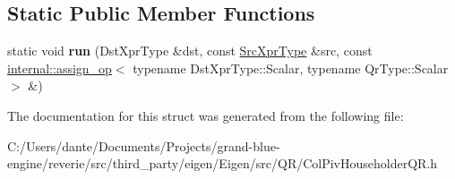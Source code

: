 \subsection*{Static Public Member Functions}
\begin{DoxyCompactItemize}
\item 
\mbox{\label{struct_eigen_1_1internal_1_1_assignment_3_01_dst_xpr_type_00_01_inverse_3_01_col_piv_householdera738c212c6cb5ba27ad8c50c6864d6b5_abd58dc876e3e7da378577a72fb5ffa06}} 
static void {\bfseries run} (Dst\+Xpr\+Type \&dst, const \mbox{\hyperlink{class_eigen_1_1_inverse}{Src\+Xpr\+Type}} \&src, const \mbox{\hyperlink{struct_eigen_1_1internal_1_1assign__op}{internal\+::assign\+\_\+op}}$<$ typename Dst\+Xpr\+Type\+::\+Scalar, typename Qr\+Type\+::\+Scalar $>$ \&)
\end{DoxyCompactItemize}


The documentation for this struct was generated from the following file\+:\begin{DoxyCompactItemize}
\item 
C\+:/\+Users/dante/\+Documents/\+Projects/grand-\/blue-\/engine/reverie/src/third\+\_\+party/eigen/\+Eigen/src/\+Q\+R/Col\+Piv\+Householder\+Q\+R.\+h\end{DoxyCompactItemize}
